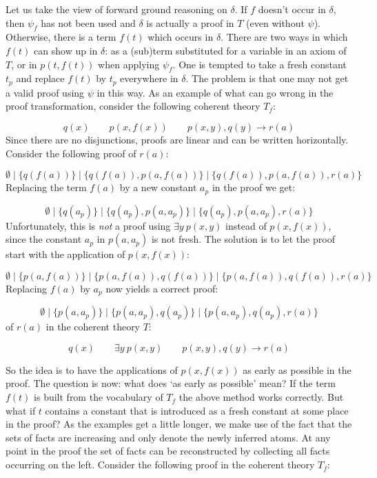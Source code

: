 \documentclass[12pt]{article}
\newcommand{\ra}{\rightarrow}
\newcommand{\set}[1]{\{#1\}}
\newcommand{\Tf}{T_{\!f}}
\newcommand{\psif}{\psi_{\!f}}
\begin{document}
Let us take the view of forward ground reasoning on $\delta$.
If $f$ doesn't occur in $\delta$, then $\psif$ has
not been used and $\delta$ is actually a proof in $T$
(even without $\psi$). Otherwise, there is a term $f(t)$ which
occurs in $\delta$. 
There are two ways in which $f(t)$ can show up in $\delta$:
as a (sub)term substituted for a variable in an axiom of $T$, or in
$p(t,f(t))$ when applying $\psif$. 
One is tempted to take a fresh constant $t_p$ and
replace $f(t)$ by $t_p$ everywhere in $\delta$.
The problem is that one may not get a valid proof using $\psi$ in this way.
As an example of what can go wrong in the proof transformation,
consider the following coherent theory $\Tf$:

\[q(x) \quad\quad p(x,f(x)) \quad\quad p(x,y),q(y)\ra r(a)\] 
Since there are no disjunctions, proofs are linear
and can be written horizontally. Consider the following proof of $r(a)$:

\[\emptyset \mid \set{q(f(a))} \mid \set{q(f(a)),p(a,f(a))} \mid \set{q(f(a)),p(a,f(a)),r(a)} \] 
Replacing the term $f(a)$ by a new constant $a_p$ in the proof we get:

\[\emptyset \mid \set{q(a_p)} \mid \set{q(a_p),p(a,a_p)} \mid \set{q(a_p),p(a,a_p),r(a)} \] 
Unfortunately, this is \emph{not} a proof using $\exists y~p(x,y)$
instead of $p(x,f(x))$, since the constant $a_p$ in $p(a,a_p)$ is not fresh.
The solution is to let the proof start with the application of $p(x,f(x))$:

\[\emptyset \mid \set{p(a,f(a))} \mid \set{p(a,f(a)),q(f(a))} \mid \set{p(a,f(a)),q(f(a)),r(a)} \]
Replacing $f(a)$ by $a_p$ now yields a correct proof:

\[\emptyset \mid \set{p(a,a_p)} \mid \set{p(a,a_p),q(a_p)} \mid \set{p(a,a_p),q(a_p),r(a)} \]
of $r(a)$ in the coherent theory $T$:

\[q(x) \quad\quad \exists y~p(x,y) \quad\quad p(x,y),q(y)\ra r(a)\]

So the idea is to have the applications of $p(x,f(x))$ as early as possible in the proof.
The question is now: what does `as early as possible' mean? If the term $f(t)$
is built from the vocabulary of $\Tf$ the above method works correctly.
But what if $t$ contains a constant that is introduced as a fresh constant at some
place in the proof? 
As the examples get a little longer, we make use of the fact that the sets
of facts are increasing and only denote the newly inferred atoms. At any point in
the proof the set of facts can be reconstructed by collecting all facts occurring on the left.
Consider the following proof in the coherent theory $\Tf$:
\end{document}
